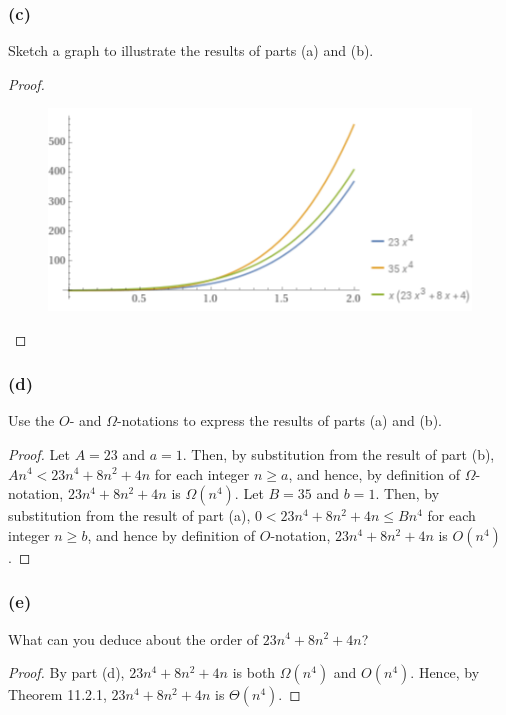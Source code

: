 \documentclass[14pt]{extarticle}
\begin{document}
\subsubsection{(c)}
Sketch a graph to illustrate the results of parts (a) and (b).
\begin{proof}
\begin{figure}[ht!]
\centering
\includegraphics[scale=0.5]{../images/11.2.11.c.png}
\end{figure}
\end{proof}

\subsubsection{(d)}
Use the \(O\)- and \(\Omega\)-notations to express the results of parts (a) and (b).

\begin{proof}
Let \(A = 23\) and \(a = 1\). Then, by substitution from the result of part (b), \(An^4 < 23n^4 + 8n^2 + 4n\) for each 
integer \(n \geq a\), and hence, by definition of \(\Omega\)-notation, \(23n^4 + 8n^2 + 4n\) is \(\Omega(n^4)\). Let 
\(B = 35\) and \(b = 1\). Then, by substitution from the result of part (a), \(0 < 23n^4 + 8n^2 + 4n \leq Bn^4\) for 
each integer \(n \geq b\), and hence by definition of \(O\)-notation, \(23n^4 + 8n^2 + 4n\) is \(O(n^4)\).
\end{proof}

\subsubsection{(e)}
What can you deduce about the order of \(23n^4 + 8n^2 + 4n\)?
\begin{proof}
By part (d), \(23n^4 + 8n^2 + 4n\) is both \(\Omega(n^4)\) and \(O(n^4)\). Hence, by Theorem 11.2.1, \(23n^4 + 8n^2 + 4n\) is 
\(\Theta(n^4)\).
\end{proof}
\end{document}
